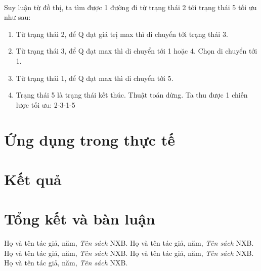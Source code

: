 \documentclass[14pt,a4paper,oneside]{report}		%
\begin{document}
\\
Suy luận từ đồ thị, ta tìm được 1 đường đi từ trạng thái 2 tới trạng thái 5 tối ưu như sau:
\begin{enumerate}
\item Từ trạng thái 2, để Q đạt giá trị max thì di chuyển tới trạng thái 3. 
\item Từ trạng thái 3, để Q đạt max thì di chuyển tới 1 hoặc 4. Chọn di chuyển tới 1.
\item Từ trạng thái 1, để Q đạt max thì di chuyển tới 5.
\item Trạng thái 5 là trạng thái kết thúc. Thuật toán dừng. Ta thu được 1 chiến lược tối ưu: 2-3-1-5
\end{enumerate}

\chapter{Ứng dụng trong thực tế}
\chapter{Kết quả}
\chapter{Tổng kết và bàn luận}
\begin{thebibliography}{12}
Họ và tên tác giả, năm, {\it Tên sách} NXB.
Họ và tên tác giả, năm, {\it Tên sách} NXB.
Họ và tên tác giả, năm, {\it Tên sách} NXB.
Họ và tên tác giả, năm, {\it Tên sách} NXB.
Họ và tên tác giả, năm, {\it Tên sách} NXB.
\end{thebibliography}
\end{document}
